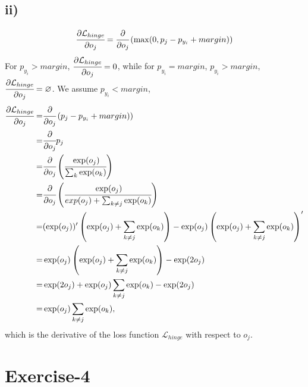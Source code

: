 \documentclass[10pt]{article}
\begin{document}
\subsection*{ii)}
\begin{align*}
\cfrac{\partial \mathcal{L}_{hinge}}{\partial o_j} = \cfrac{\partial}{\partial o_j} \left(   \max(0, p_j - p_{y_i} + margin) \right)
\end{align*}
For $p_{y_i} > margin$, $\cfrac{\partial \mathcal{L}_{hinge}}{\partial o_j} = 0$, while for $p_{y_i} = margin$, $p_{y_i} > margin$, $\cfrac{\partial \mathcal{L}_{hinge}}{\partial o_j} = \varnothing$.
We assume $p_{y_i} < margin$,
\begin{align*}
\cfrac{\partial \mathcal{L}_{hinge}}{\partial o_j} =& \cfrac{\partial}{\partial o_j} \left(   p_j - p_{y_i} + margin) \right)\\
=& \cfrac{\partial}{\partial o_j} p_j\\
=& \cfrac{\partial}{\partial o_j} \left( \cfrac{\exp(o_j)}{\sum_k \exp(o_k)} \right)\\
=& \cfrac{\partial}{\partial o_j} \left( \cfrac{\exp(o_j)}{exp(o_j) + \sum_{k \neq j } \exp(o_k)} \right)\\
=& (\exp(o_j))' \left( \exp(o_j) + \sum_{k \neq j } \exp(o_k) \right) - \exp(o_j) \left( \exp(o_j) + \sum_{k \neq j } \exp(o_k) \right) '\\
=& \exp(o_j) \left( \exp(o_j) + \sum_{k \neq j } \exp(o_k) \right) - \exp(2o_j)\\
=& \exp(2o_j) + \exp(o_j) \sum_{k \neq j } \exp(o_k) - \exp(2o_j)\\
=& \exp(o_j) \sum_{k \neq j } \exp(o_k),
\end{align*}
which is the derivative of the loss function $\mathcal{L}_{hinge}$ with respect to $o_j$.



\section*{Exercise-4}
\end{document}
